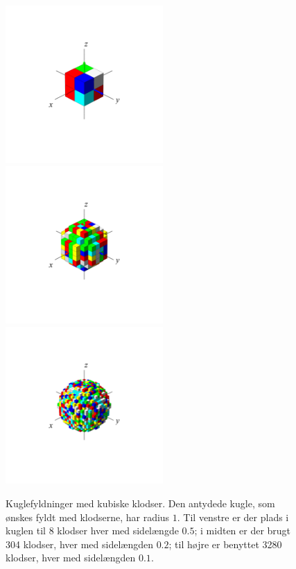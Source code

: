 \begin{figure}[ht]
\centerline{  \includegraphics[height=60mm]{FIGS/plotSphereFillB.pdf}  \includegraphics[height=60mm]{FIGS/plotSphereFillC.pdf}  \includegraphics[height=60mm]{FIGS/plotSphereFillD.pdf}}
\begin{center}
\caption{\small{Kuglefyldninger med kubiske klodser. Den antydede kugle, som ønskes fyldt med klodserne, har radius $1$.
Til venstre er der plads i kuglen til $8$ klodser hver med sidelængde $0.5$; i midten er der brugt 304 klodser, hver med sidelængden $0.2$; til højre er
benyttet 3280 klodser, hver med sidelængden $0.1$.}}
\label{figSphereFill}
\end{center}
\end{figure}




